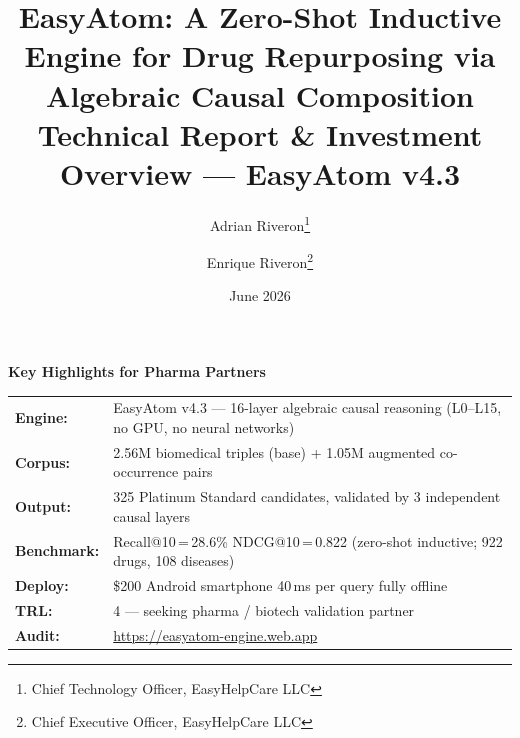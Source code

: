 \documentclass[11pt]{article}
\title{\textbf{EasyAtom: A Zero-Shot Inductive Engine for Drug Repurposing
       via Algebraic Causal Composition}\\[0.5em]
       \large Technical Report \& Investment Overview --- EasyAtom v4.3}
\author[1]{Adrian Riveron\thanks{Chief Technology Officer, EasyHelpCare LLC}}
\author[1]{Enrique Riveron\thanks{Chief Executive Officer, EasyHelpCare LLC}}
\affil[1]{EasyHelpCare LLC, Naples, Florida, USA}
\date{June 2026}
\begin{document}
\maketitle
\thispagestyle{empty}

\vspace{0.5em}
\noindent\colorbox{blue!7}{\begin{minipage}{\linewidth}
\vspace{8pt}
\begin{center}\textbf{\large Key Highlights for Pharma Partners}\end{center}
\vspace{4pt}
\begin{tabular}{@{}ll@{}}
  \textbf{Engine:}    & EasyAtom v4.3 --- 16-layer algebraic causal reasoning (L0--L15, no GPU, no neural networks) \\[2pt]
  \textbf{Corpus:}    & 2.56M biomedical triples (base) + 1.05M augmented co-occurrence pairs \\[2pt]
  \textbf{Output:}    & 325 Platinum Standard candidates, validated by 3 independent causal layers \\[2pt]
  \textbf{Benchmark:} & Recall@10\,=\,28.6\% \textbar{} NDCG@10\,=\,0.822 (zero-shot inductive; 922 drugs, 108 diseases) \\[2pt]
  \textbf{Deploy:}    & \$200 Android smartphone \textbar{} 40\,ms per query \textbar{} fully offline \\[2pt]
  \textbf{TRL:}       & 4 --- seeking pharma / biotech validation partner \\[2pt]
  \textbf{Audit:}     & \url{https://easyatom-engine.web.app} \\
\end{tabular}
\vspace{8pt}
\end{minipage}}
\vspace{0.4em}
\end{document}
